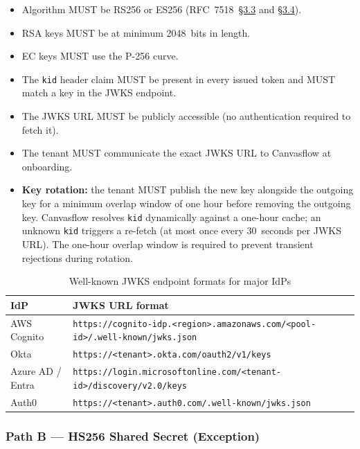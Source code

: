 \begin{itemize}
  \item Algorithm MUST be RS256 or ES256 (RFC~7518~\href{https://datatracker.ietf.org/doc/html/rfc7518\#section-3.3}{\S3.3} and \href{https://datatracker.ietf.org/doc/html/rfc7518\#section-3.4}{\S3.4}).
  \item RSA keys MUST be at minimum 2048~bits in length.
  \item EC keys MUST use the P-256 curve.
  \item The \texttt{kid} header claim MUST be present in every issued token and MUST
    match a key in the JWKS endpoint.
  \item The JWKS URL MUST be publicly accessible (no authentication required to fetch it).
  \item The tenant MUST communicate the exact JWKS URL to Canvasflow at onboarding.
  \item \textbf{Key rotation:} the tenant MUST publish the new key alongside the outgoing
    key for a minimum overlap window of one hour before removing the outgoing key.
    Canvasflow resolves \texttt{kid} dynamically against a one-hour cache; an unknown
    \texttt{kid} triggers a re-fetch (at most once every 30~seconds per JWKS URL). The
    one-hour overlap window is required to prevent transient rejections during rotation.
\end{itemize}

\begin{table}[htbp]
\centering
\begin{tabularx}{\textwidth}{@{}lX@{}}
\toprule
\textbf{IdP} & \textbf{JWKS URL format} \\
\midrule
AWS Cognito      & {\scriptsize\texttt{https://cognito-idp.<region>.amazonaws.com/<pool-id>/.well-known/jwks.json}} \\[4pt]
Okta             & {\scriptsize\texttt{https://<tenant>.okta.com/oauth2/v1/keys}} \\[4pt]
Azure AD / Entra & {\scriptsize\texttt{https://login.microsoftonline.com/<tenant-id>/discovery/v2.0/keys}} \\[4pt]
Auth0            & {\scriptsize\texttt{https://<tenant>.auth0.com/.well-known/jwks.json}} \\[4pt]
\bottomrule
\end{tabularx}
\caption{Well-known JWKS endpoint formats for major IdPs}
\end{table}

\pagebreak

\subsubsection{Path B --- HS256 Shared Secret (Exception)}

